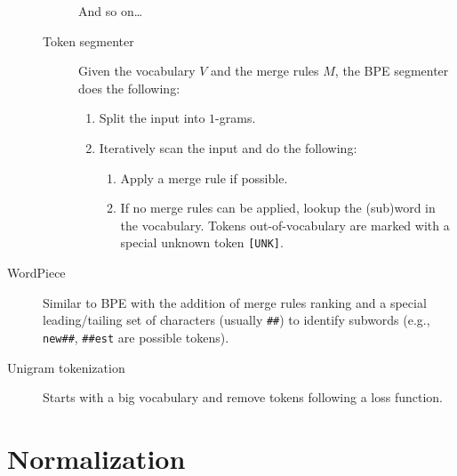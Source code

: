 \begin{description}
\begin{description}
\begin{example}
                    And so on\dots
                \end{example}

            \item[Token segmenter]
                Given the vocabulary $V$ and the merge rules $M$, the BPE segmenter does the following:
                \begin{enumerate}
                    \item Split the input into $1$-grams.
                    \item Iteratively scan the input and do the following:
                    \begin{enumerate}
                        \item Apply a merge rule if possible.
                        \item If no merge rules can be applied, lookup the (sub)word in the vocabulary. Tokens out-of-vocabulary are marked with a special unknown token \texttt{[UNK]}.
                    \end{enumerate}
                \end{enumerate}
        \end{description}

    \item[WordPiece] 
        Similar to BPE with the addition of merge rules ranking and a special leading/tailing set of characters (usually \texttt{\#\#}) to identify subwords (e.g., \texttt{new\#\#}, \texttt{\#\#est} are possible tokens).

    \item[Unigram tokenization] 
        Starts with a big vocabulary and remove tokens following a loss function.
\end{description}



\section{Normalization}

